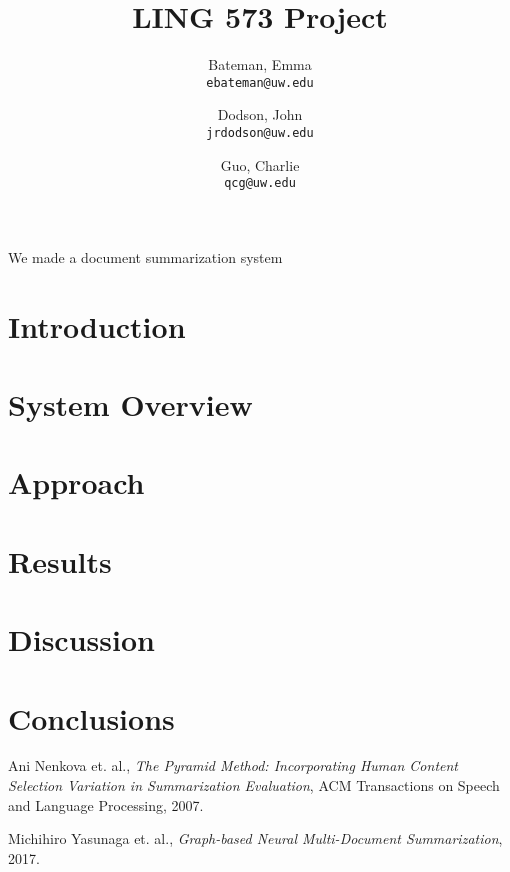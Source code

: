 \documentclass[11pt]{article}
\author{Bateman, Emma \\
  \texttt{ebateman@uw.edu}
  \and
  Dodson, John \\
  \texttt{jrdodson@uw.edu}
  \and
  Guo, Charlie \\
  \texttt{qcg@uw.edu}}
\title{LING 573 Project}
\begin{document}
\maketitle

\abstract
We made a document summarization system

\section{Introduction}

\section{System Overview}

\section{Approach}

\section{Results}

\section{Discussion}

\section{Conclusions}

\begin{thebibliography}{11}
	Ani Nenkova et. al.,
	\textit{The Pyramid Method: Incorporating Human Content Selection Variation in Summarization Evaluation},
	ACM Transactions on Speech and Language Processing,
	2007.
	
	Michihiro Yasunaga et. al.,
	\textit{Graph-based Neural Multi-Document Summarization},
	2017.
	
\end{thebibliography}
\end{document}
